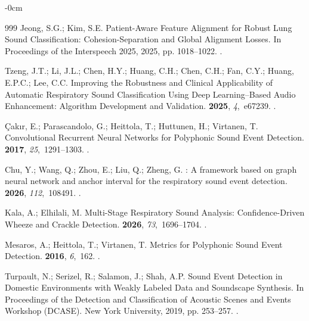 \documentclass[algorithms,article,submit,pdftex,oneauthor]{Definitions/mdpi}
\begin{document}
\begin{adjustwidth}{-\extralength}{0cm}
\begin{thebibliography}{999}
Jeong, S.G.; Kim, S.E.
\newblock Patient-Aware Feature Alignment for Robust Lung Sound Classification:
  Cohesion-Separation and Global Alignment Losses.
\newblock In Proceedings of the Interspeech 2025,  2025, pp. 1018--1022.
.

Tzeng, J.T.; Li, J.L.; Chen, H.Y.; Huang, C.H.; Chen, C.H.; Fan, C.Y.; Huang,
  E.P.C.; Lee, C.C.
\newblock Improving the Robustness and Clinical Applicability of Automatic
  Respiratory Sound Classification Using Deep Learning--Based Audio
  Enhancement: Algorithm Development and Validation.
 {\bf 2025}, {\em 4},~e67239.
.

{\c{C}}ak{\i}r, E.; Parascandolo, G.; Heittola, T.; Huttunen, H.; Virtanen, T.
\newblock Convolutional Recurrent Neural Networks for Polyphonic Sound Event
  Detection.
  {\bf 2017}, {\em 25},~1291--1303.
.

Chu, Y.; Wang, Q.; Zhou, E.; Liu, Q.; Zheng, G.
: A framework based on graph neural network and anchor
  interval for the respiratory sound event detection.
 {\bf 2026}, {\em
  112},~108491.
.

Kala, A.; Elhilali, M.
\newblock Multi-Stage Respiratory Sound Analysis: Confidence-Driven Wheeze and
  Crackle Detection.
 {\bf 2026}, {\em
  73},~1696--1704.
.

Mesaros, A.; Heittola, T.; Virtanen, T.
\newblock Metrics for Polyphonic Sound Event Detection.
 {\bf 2016}, {\em 6},~162.
.

Turpault, N.; Serizel, R.; Salamon, J.; Shah, A.P.
\newblock Sound Event Detection in Domestic Environments with Weakly Labeled
  Data and Soundscape Synthesis.
\newblock In Proceedings of the Detection and Classification of Acoustic Scenes
  and Events Workshop (DCASE). New York University,  2019, pp. 253--257.
.


\end{thebibliography}
\end{adjustwidth}
\end{document}
